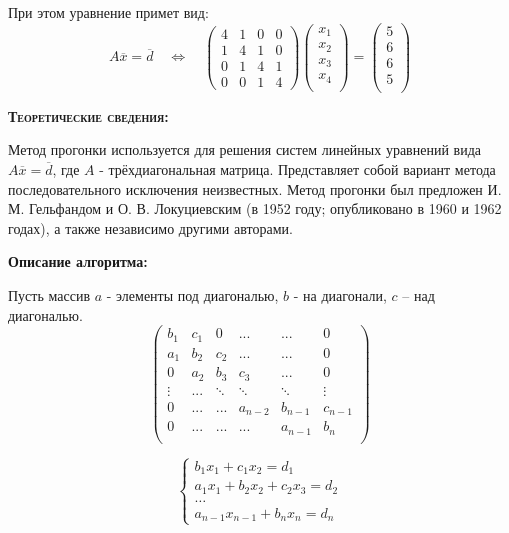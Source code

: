 \documentclass [12pt]{article}
\begin{document}
При этом уравнение примет вид:
$$ A\overline{x}=\overline{d}
\quad   \Leftrightarrow \quad
\left(\begin{array}{cccc} 
4 & 1 & 0 & 0 \\
1 & 4 & 1 & 0 \\
0 & 1 & 4 & 1 \\
0 & 0 & 1 & 4  
\end{array}\right)
\left(\begin{array}{c} 
x_1 \\
x_2 \\
x_3 \\
x_4 \\
\end{array}\right)
 =
\left(\begin{array}{c} 
5 \\
6 \\
6 \\
5 \\
\end{array}\right) $$

\textsc{\textbf{Теоретические сведения:}}

Метод прогонки используется для решения систем линейных уравнений вида $ A\overline{x}=\overline{d}$, где $A$ - трёхдиагональная матрица. Представляет собой вариант метода последовательного исключения неизвестных. Метод прогонки был предложен И. М. Гельфандом и О. В. Локуциевским (в 1952 году; опубликовано в 1960 и 1962 годах), а также независимо другими авторами.

\textbf{Описание алгоритма:}

Пусть массив $a$ - элементы под диагональю, $b$ - на диагонали, $c$ – над диагональю.
$$\left(\begin{array}{cccccc} 
b_1 & c_1 & 0 & ... & ... &  0 \\
a_1 & b_2 & c_2 & ... & ... &  0 \\
0 & a_2 & b_3 & c_3 & ... &  0 \\
\vdots & ... & \ddots & \ddots & \ddots &  \vdots \\
0 & ... & ... & a_{n-2} & b_{n-1} & c_{n-1} \\
0 & ... & ... & ... & a_{n-1} & b_n \\
\end{array}\right) $$

\begin{equation*}
\begin{cases}
b_1x_1+c_1x_2=d_1\\
a_1x_1+b_2x_2+c_2x_3=d_2 \\
… \\
a_{n-1}x_{n-1}+b_nx_n=d_n 
\end{cases}
\end{equation*}
\end{document}
